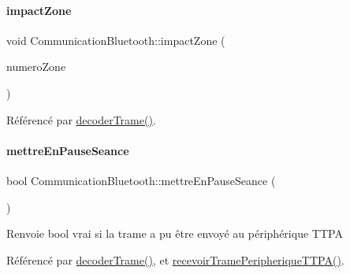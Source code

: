 \paragraph{\texorpdfstring{impact\+Zone}{impactZone}}
{\footnotesize\ttfamily void Communication\+Bluetooth\+::impact\+Zone (\begin{DoxyParamCaption}\item[{Q\+String}]{numero\+Zone }\end{DoxyParamCaption})\hspace{0.3cm}{\ttfamily [signal]}}



Référencé par \hyperlink{class_communication_bluetooth_a6b53f12131d9323cec8f2a03fe716e6a}{decoder\+Trame()}.

\mbox{\label{class_communication_bluetooth_a8572b6316814e3d226ce7acc754f0c4d}} 
\paragraph{\texorpdfstring{mettre\+En\+Pause\+Seance}{mettreEnPauseSeance}\hspace{0.1cm}{\footnotesize\ttfamily [1/2]}}
{\footnotesize\ttfamily bool Communication\+Bluetooth\+::mettre\+En\+Pause\+Seance (\begin{DoxyParamCaption}{ }\end{DoxyParamCaption})\hspace{0.3cm}{\ttfamily [signal]}}

\begin{DoxyReturn}{Renvoie}
bool vrai si la trame a pu être envoyé au périphérique T\+T\+PA 
\end{DoxyReturn}


Référencé par \hyperlink{class_communication_bluetooth_a6b53f12131d9323cec8f2a03fe716e6a}{decoder\+Trame()}, et \hyperlink{class_communication_bluetooth_ae50bbbf70a5afdea0a0c4d3322e90e40}{recevoir\+Trame\+Peripherique\+T\+T\+P\+A()}.


